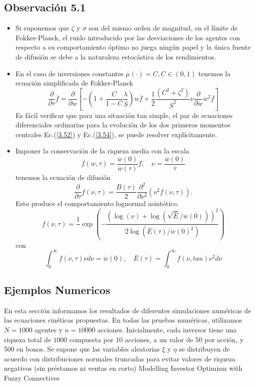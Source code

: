 \documentclass[12pt,a4paper]{article}
\begin{document}
\subsection*{Observación 5.1}
\begin{itemize}
\item Si suponemos que $\zeta$ y $\sigma$ son del mismo orden de magnitud, en el límite de Fokker-Planck, el ruido introducido por las desviaciones de los agentes con respecto a su comportamiento óptimo no juega ningún papel y la única fuente de difusión se debe a la naturaleza estocástica de los rendimientos.
\item En el caso de inversiones constantes $\overline{\mu}(\cdot)= C, C\in (0,1)$ tenemos la ecuación simplificada de Fokker-Planck 
$$
\frac{\partial }{\partial \tau}\overline{f}=\frac{\partial}{\partial w}\left[-\left(1+\frac{C}{1-C}\frac{\lambda}{\overline{S}}\right)w\overline{f}+\frac{1}{2}\frac{(C^2+\zeta^2)}{\overline{S}^2}\nu\frac{\partial}{\partial w}w^2\overline{f}\right]
$$
Es fácil verificar que para una situación tan simple, el par de ecuaciones diferenciales ordinarias para la evolución de los dos primeros momentos centrales Ec.(\ref{3.52}) y Ec.(\ref{3.54}), se puede resolver explícitamente.
\item Imponer la conservación de la riqueza media con la escala
\begin{equation}
\overline{f}(w,\tau) = \frac{\overline{w}(0)}{\overline{w}(\tau)}f,\quad \nu= \frac{\overline{w}(0)}{\overline{\tau}}\label{3.59}
\end{equation}
tenemos la ecuación de difusión
$$
\frac{\partial}{\partial \tau} f(\nu,\tau)=\frac{B(\tau)}{2}\frac{\partial^2}{\partial \nu^2}(\nu^2f(\nu,\tau)).
$$
Esto produce el comportamiento lognormal asintótico.
\begin{equation}
f(\nu,\tau)=\frac{1}{}\exp\left(-\frac{(\log{(\nu)}+\log{(\sqrt{\overline{E}}/\overline{w}(0))})^2}{2\log{(\overline{E}(\tau)/\overline{w}(0)^2)}}\right)\label{3.60}
\end{equation}
con
$$
\int^{\infty}_{0}f(\nu,\tau)\nu d\nu=\overline{w}(0),\quad \overline{E}(\tau)=\int^{\infty}_{0}f(\nu,tau)\nu^2d\nu
$$
\end{itemize}
\subsection*{Ejemplos Numericos}
\quad En esta sección informamos los resultados de diferentes simulaciones numéricas de las ecuaciones cinéticas propuestas. En todas las pruebas numéricas, utilizamos $N = 1000$ agentes y $n = 10000$ acciones. Inicialmente, cada inversor tiene una riqueza total de $1000$ compuesta por 10 acciones, a un valor de 50 por acción, y 500 en bonos. Se supone que las variables aleatorias $ \xi$ y $\eta$ se distribuyen de acuerdo con distribuciones normales truncadas para evitar valores de riqueza negativos (sin préstamos ni ventas en corto)
\newpage
Modelling Investor Optimism with Fuzzy Connectives\citep{lovric2009}
\end{document}
